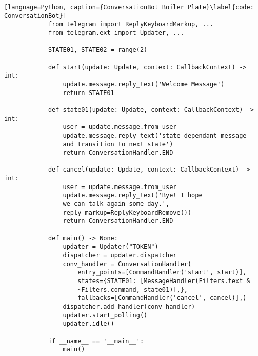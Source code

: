         \begin{lstlisting}[language=Python, caption={ConversationBot Boiler Plate}\label{code: ConversationBot}]
            from telegram import ReplyKeyboardMarkup, ...
            from telegram.ext import Updater, ... 
            
            STATE01, STATE02 = range(2)
            
            def start(update: Update, context: CallbackContext) -> int:
                update.message.reply_text('Welcome Message')
                return STATE01
            
            def state01(update: Update, context: CallbackContext) -> int:
                user = update.message.from_user
                update.message.reply_text('state dependant message 
                and transition to next state')
                return ConversationHandler.END
            
            def cancel(update: Update, context: CallbackContext) -> int:
                user = update.message.from_user
                update.message.reply_text('Bye! I hope 
                we can talk again some day.', 
                reply_markup=ReplyKeyboardRemove())
                return ConversationHandler.END
            
            def main() -> None:
                updater = Updater("TOKEN")
                dispatcher = updater.dispatcher
                conv_handler = ConversationHandler(
                    entry_points=[CommandHandler('start', start)],
                    states={STATE01: [MessageHandler(Filters.text & 
                    ~Filters.command, state01)],},
                    fallbacks=[CommandHandler('cancel', cancel)],)
                dispatcher.add_handler(conv_handler)
                updater.start_polling()
                updater.idle()
            
            if __name__ == '__main__':
                main()
        \end{lstlisting}


